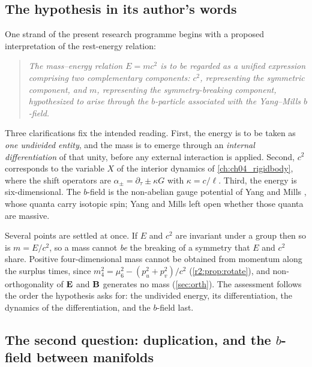 \subsection{The hypothesis in its author's words}

One strand of the present research programme begins with a proposed interpretation of the rest-energy relation:
\begin{quote}
\emph{The mass--energy relation $E=mc^2$ is to be regarded as a unified expression comprising two complementary components: $c^2$,
representing the symmetric component, and $m$, representing the symmetry-breaking component, hypothesized to arise through the
$b$-particle associated with the Yang--Mills $b$-field.}
\end{quote}
Three clarifications fix the intended reading. First, the energy is to be taken as \emph{one undivided entity}, and the mass is to
emerge through an \emph{internal differentiation} of that unity, before any external interaction is applied. Second, $c^2$ corresponds to
the variable $X$ of the interior dynamics of \cref{ch:ch04_rigidbody}, where the shift operators are $\alpha_\pm=\partial_\tau\pm\kappa G$ with $\kappa=c/\ell$. Third, the energy
is six-dimensional. The $b$-field is the non-abelian gauge potential of Yang and Mills \cite{YangMills54}, whose quanta carry isotopic
spin; Yang and Mills left open whether those quanta are massive.

Several points are settled at once. If $E$ and $c^2$ are invariant under a group then so is $m=E/c^2$, so a mass cannot \emph{be} the
breaking of a symmetry that $E$ and $c^2$ share. Positive four-dimensional mass cannot be obtained from momentum along the surplus times,
since $m_4^2=\mu_6^2-(p_u^2+p_v^2)/c^2$ (\cref{r2:prop:rotate}), and non-orthogonality of $\mathbf E$ and $\mathbf B$ generates no mass (\cref{sec:orth}). The
assessment follows the order the hypothesis asks for: the undivided energy, its differentiation, the dynamics of the differentiation, and the
$b$-field last.

\subsection{The second question: duplication, and the \texorpdfstring{$b$}{b}-field between manifolds}

